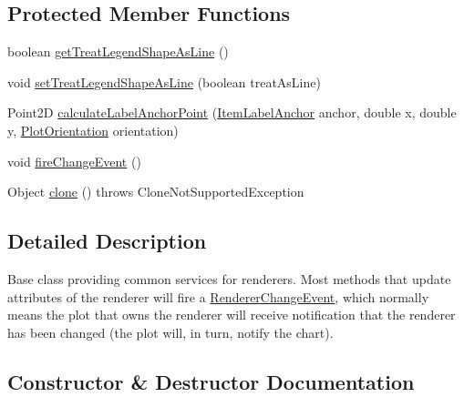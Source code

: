 \subsection*{Protected Member Functions}
\begin{DoxyCompactItemize}
\item 
boolean \mbox{\hyperlink{classorg_1_1jfree_1_1chart_1_1renderer_1_1_abstract_renderer_a29745da1503b3fb64e1f6aafbfd4c5e3}{get\+Treat\+Legend\+Shape\+As\+Line}} ()
\item 
void \mbox{\hyperlink{classorg_1_1jfree_1_1chart_1_1renderer_1_1_abstract_renderer_a0944c12ac3997ba88e158bca1ac60184}{set\+Treat\+Legend\+Shape\+As\+Line}} (boolean treat\+As\+Line)
\item 
Point2D \mbox{\hyperlink{classorg_1_1jfree_1_1chart_1_1renderer_1_1_abstract_renderer_a0caeba8ab3f4f349f4a1ad1151f6aa84}{calculate\+Label\+Anchor\+Point}} (\mbox{\hyperlink{classorg_1_1jfree_1_1chart_1_1labels_1_1_item_label_anchor}{Item\+Label\+Anchor}} anchor, double x, double y, \mbox{\hyperlink{classorg_1_1jfree_1_1chart_1_1plot_1_1_plot_orientation}{Plot\+Orientation}} orientation)
\item 
void \mbox{\hyperlink{classorg_1_1jfree_1_1chart_1_1renderer_1_1_abstract_renderer_a5008f133b351c9c6c72d7abca08f65a7}{fire\+Change\+Event}} ()
\item 
Object \mbox{\hyperlink{classorg_1_1jfree_1_1chart_1_1renderer_1_1_abstract_renderer_a6c01c84fe469a7d5d06bfd268828cd7b}{clone}} ()  throws Clone\+Not\+Supported\+Exception 
\end{DoxyCompactItemize}


\subsection{Detailed Description}
Base class providing common services for renderers. Most methods that update attributes of the renderer will fire a \mbox{\hyperlink{}{Renderer\+Change\+Event}}, which normally means the plot that owns the renderer will receive notification that the renderer has been changed (the plot will, in turn, notify the chart). 

\subsection{Constructor \& Destructor Documentation}
\mbox{\label{classorg_1_1jfree_1_1chart_1_1renderer_1_1_abstract_renderer_a272d66a38a9ce6f18eafbdbd594aff9d}} 

